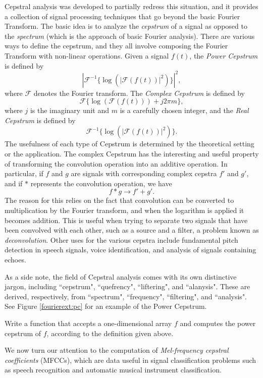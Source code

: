 Cepstral analysis was developed to partially redress this situation, and it provides a collection of signal
processing techniques that go beyond the basic Fourier Transform. The basic idea is to analyze the
\emph{cepstrum} of a signal as opposed to the \emph{spectrum} (which is the approach of basic Fourier
analysis). There are various ways to define the cepstrum, and they all involve composing the Fourier
Transform with non-linear operations. Given a signal $f(t)$, the \emph{Power Cepstrum} is defined by
$$
\left|\mathcal{F}^{-1}\{\log(|\mathcal{F}(f(t))|^2)\}\right|^2,
$$
where $\mathcal{F}$ denotes the Fourier transform. The \emph{Complex Cepstrum} is defined by
$$
\mathcal{F}\{\log(\mathcal{F}(f(t)))+j2\pi m\},
$$
where $j$ is the imaginary unit and $m$ is a carefully chosen integer, and the \emph{Real Cepstrum}
is defined by
$$
\mathcal{F}^{-1}\{\log(|\mathcal{F}(f(t))|^2)\}.
$$
The usefulness of each type of Cepstrum is determined by the theoretical setting or the application.
The complex Cepstrum has the interesting and useful property of transforming the convolution operation
into an additive operation. In particular, if $f$ and $g$ are signals with corresponding complex
cepstra $f'$ and $g'$, and if $*$ represents the convolution operation, we have
$$
f * g \rightarrow f' + g'.
$$
The reason for this relies on the fact that convolution can be converted to multiplication by
the Fourier transform, and when the logarithm is applied it becomes addition.
This is useful when trying to separate two signals that have been convolved with each other, such as
a source and a filter, a problem known as \emph{deconvolution}.
Other uses for the various cepstra include fundamental pitch detection in speech signals, voice
identification, and analysis of signals containing echoes.

As a side note, the field of Cepstral analysis comes with its own distinctive jargon, including ``cepstrum",
``quefrency", ``liftering", and ``alanysis". These are derived, respectively, from ``spectrum",
``frequency", ``filtering", and ``analysis". See Figure \ref{fourierext:pc} for an example of the Power
Cepstrum.

\begin{problem}
Write a function  that accepts a one-dimensional array $f$ and computes the
power cepstrum of $f$, according to the definition given above.
\end{problem}

We now turn our attention to the computation of \emph{Mel-frequency cepstral coefficients} (MFCCs), which
are data useful in signal classification problems such as
speech recognition and automatic musical instrument classification.

